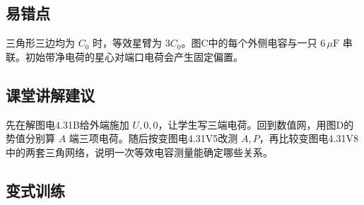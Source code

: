 \documentclass[UTF8,fontset=fandol,a4paper,11pt]{ctexart}
\begin{document}


\subsection*{易错点}

三角形三边均为 $C_0$ 时，等效星臂为 $3C_0$。图C中的每个外侧电容与一只 $6\,\mu\mathrm F$ 串联。初始带净电荷的星心对端口电荷会产生固定偏置。



\subsection*{课堂讲解建议}

先在解图电4.31B给外端施加 $U,0,0$，让学生写三端电荷。回到数值网，用图D的势值分别算 $A$ 端三项电荷。随后按变图电4.31V5改测 $A,P$，再比较变图电4.31V8中的两套三角网络，说明一次等效电容测量能确定哪些关系。


\subsection*{变式训练}
\end{document}
